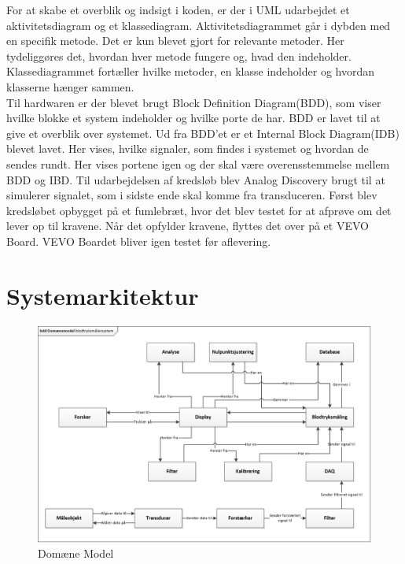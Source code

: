 \newline 
For at skabe et overblik og indsigt i koden, er der i UML udarbejdet et aktivitetsdiagram og et klassediagram. Aktivitetsdiagrammet går i dybden med en specifik metode. Det er kun blevet gjort for relevante metoder. Her tydeliggøres det, hvordan hver metode fungere og, hvad den indeholder.  Klassediagrammet fortæller hvilke metoder, en klasse indeholder og hvordan klasserne hænger sammen.\\
\newline  
Til hardwaren er der blevet brugt Block Definition Diagram(BDD), som viser hvilke blokke et system indeholder og hvilke porte de har. BDD er lavet til at give et overblik over systemet. Ud fra BDD’et er et Internal Block Diagram(IDB) blevet lavet. Her vises, hvilke signaler, som findes i systemet og hvordan de sendes rundt. Her vises portene igen og der skal være overensstemmelse mellem BDD og IBD.    
\newline 
Til udarbejdelsen af kredsløb blev Analog Discovery brugt til at simulerer signalet, som i sidste ende skal komme fra transduceren. Først blev kredsløbet opbygget på et fumlebræt, hvor det blev testet for at afprøve om det lever op til kravene. Når det opfylder kravene, flyttes det over på et VEVO Board. VEVO Boardet bliver igen testet før aflevering. 

\section{Systemarkitektur}

\begin{figure}[H]
	\centering
	\includegraphics[width=1.0\textwidth]{Figurer/DomaneModel}
	\caption{Domæne Model}
	\label{fig:Domaene Model}
\end{figure}


